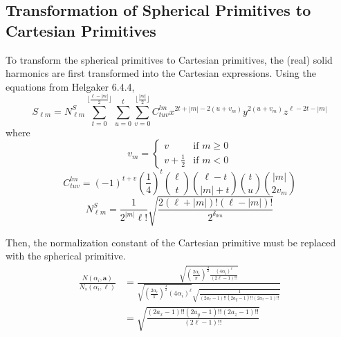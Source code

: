\documentclass[letterpaper]{article}
\begin{document}
\subsection{Transformation of Spherical Primitives to Cartesian Primitives}
To transform the spherical primitives to Cartesian primitives, the (real) solid
harmonics are first transformed into the Cartesian expressions.
Using the equations from Helgaker 6.4.4,
\begin{equation}
  \label{eq:helgaker_6.4.47}
  S_{\ell m}
  =
  N_{\ell m}^S
  \sum_{t=0}^{\lfloor \frac{\ell - |m|}{2} \rfloor}
  \sum_{u=0}^t \sum_{v=0}^{\lfloor\frac{|m|}{2} \rfloor}
  C^{lm}_{tuv} x^{2t + |m| - 2(u+v_m)} y^{2(u+v_m)} z^{\ell - 2t - |m|}
\end{equation}
where
\begin{equation}
  \label{eq:helgaker_6.4.50}
  v_m =
  \begin{cases}
    v & \mbox {if $m \geq 0$}\\
    v + \frac{1}{2} & \mbox {if $m < 0$}
  \end{cases}
\end{equation}
\begin{equation}
  \label{eq:helgaker_6.4.48}
  C^{lm}_{tuv} =
  (-1)^{t+v}
  \left( \frac{1}{4} \right)^t
  \binom{\ell}{t} \binom{\ell -t}{|m| + t} \binom{t}{u} \binom{|m|}{2 v_m}
\end{equation}
\begin{equation}
  \label{eq:helgaker_6.4.49}
  N_{\ell m}^S =
  \frac{1}{2^{|m|} \ell!}
  \sqrt{
    \frac{2 (\ell + |m|)! (\ell - |m|)!}{2^{\delta_{0m}}}
  }
\end{equation}

Then, the normalization constant of the Cartesian primitive must be replaced
with the spherical primitive.
\begin{equation}
  \begin{split}
    \frac{N(\alpha_i, \mathbf{a})}{N_s(\alpha_i, \ell)}
    &= \frac{
      \sqrt{
        \left(\frac{2 \alpha_i}{\pi} \right)^{\frac{3}{2}}
        \frac{(4 \alpha_i)^{\ell}}{(2\ell - 1)!!}
      }
    }{
      \sqrt{
        \left(\frac{2 \alpha_i}{\pi} \right)^{\frac{3}{2}} (4 \alpha_i)^{\ell}
      }
      \sqrt{
        \frac{1}{(2 a_x -1)!! (2 a_y -1)!! (2 a_z -1)!!}
      }
    }\\
    &= \sqrt{\frac{(2 a_x -1)!! (2 a_y -1)!! (2 a_z -1)!!}{(2\ell - 1)!!}}
  \end{split}
\end{equation}
\end{document}
